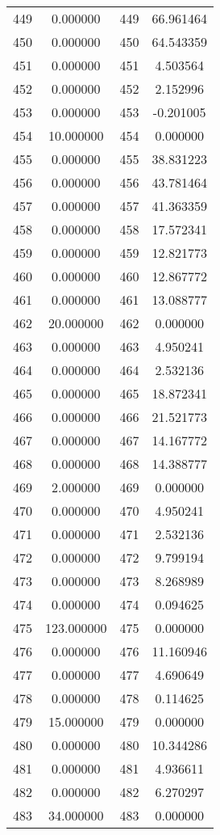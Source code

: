 \documentclass[12pt]{article}
\begin{document}
\begin{longtable}{@{}cccc@{}}
449 & 0.000000 & 449 & 66.961464 \\
450 & 0.000000 & 450 & 64.543359 \\
451 & 0.000000 & 451 & 4.503564 \\
452 & 0.000000 & 452 & 2.152996 \\
453 & 0.000000 & 453 & -0.201005 \\
454 & 10.000000 & 454 & 0.000000 \\
455 & 0.000000 & 455 & 38.831223 \\
456 & 0.000000 & 456 & 43.781464 \\
457 & 0.000000 & 457 & 41.363359 \\
458 & 0.000000 & 458 & 17.572341 \\
459 & 0.000000 & 459 & 12.821773 \\
460 & 0.000000 & 460 & 12.867772 \\
461 & 0.000000 & 461 & 13.088777 \\
462 & 20.000000 & 462 & 0.000000 \\
463 & 0.000000 & 463 & 4.950241 \\
464 & 0.000000 & 464 & 2.532136 \\
465 & 0.000000 & 465 & 18.872341 \\
466 & 0.000000 & 466 & 21.521773 \\
467 & 0.000000 & 467 & 14.167772 \\
468 & 0.000000 & 468 & 14.388777 \\
469 & 2.000000 & 469 & 0.000000 \\
470 & 0.000000 & 470 & 4.950241 \\
471 & 0.000000 & 471 & 2.532136 \\
472 & 0.000000 & 472 & 9.799194 \\
473 & 0.000000 & 473 & 8.268989 \\
474 & 0.000000 & 474 & 0.094625 \\
475 & 123.000000 & 475 & 0.000000 \\
476 & 0.000000 & 476 & 11.160946 \\
477 & 0.000000 & 477 & 4.690649 \\
478 & 0.000000 & 478 & 0.114625 \\
479 & 15.000000 & 479 & 0.000000 \\
480 & 0.000000 & 480 & 10.344286 \\
481 & 0.000000 & 481 & 4.936611 \\
482 & 0.000000 & 482 & 6.270297 \\
483 & 34.000000 & 483 & 0.000000 \\

\end{longtable}
\end{document}
